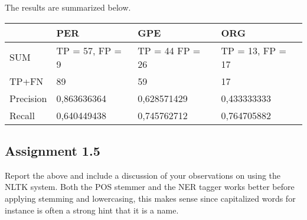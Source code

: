 \documentclass[a4paper]{article}
\begin{document}
The results are summarized below. 

\begin{center}
    \begin{tabular}{ | l | l | l | l |}
    \hline
           & PER              & GPE             & ORG \\ \hline
    SUM    & TP = 57,  FP = 9 & TP = 44 FP = 26 & TP = 13,  FP = 17 \\ \hline
	TP+FN  &     89           &     59          &      17           \\ \hline
	Precision & 0,863636364   &  0,628571429    & 0,433333333 \\ \hline
	Recall &  0,640449438     &  0,745762712    & 0,764705882 \\ \hline
    \hline
    \end{tabular}
\end{center}
                          

\subsection{Assignment 1.5}
Report the above and include a discussion of your observations on using the NLTK system.
Both the POS stemmer and the NER tagger works better before applying stemming and lowercasing, 
this makes sense since capitalized words for instance is often a strong hint that it is a
name. 
\end{document}
